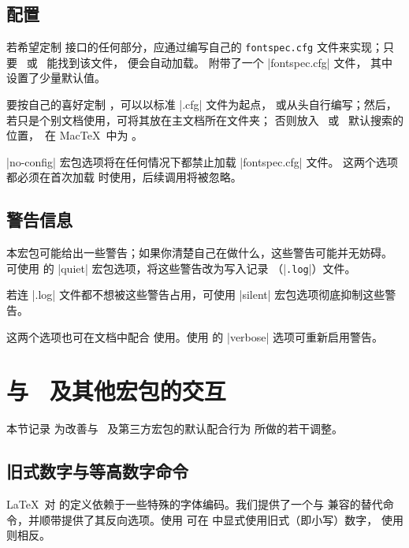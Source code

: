 \documentclass[a4paper]{l3doc}
\begin{document}
\subsection{配置}
\label{sec:config}

若希望定制  接口的任何部分，应通过编写自己的
\texttt{fontspec.cfg} 文件来实现；只要 \XeTeX\ 或 \LuaTeX\ 能找到该文件，
便会自动加载。 附带了一个 |fontspec.cfg| 文件，
其中设置了少量默认值。

要按自己的喜好定制 ，可以以标准 |.cfg| 文件为起点，
或从头自行编写；然后，若只是个别文档使用，可将其放在主文档所在文件夹；
否则放入 \XeTeX\ 或 \LuaTeX\ 默认搜索的位置，\eg\ 在 Mac\TeX\ 中为
。

|no-config| 宏包选项将在任何情况下都禁止加载 |fontspec.cfg| 文件。
这两个选项都必须在首次加载  时使用，后续调用将被忽略。


\subsection{警告信息}
\label{sec:quiet-warnings}

本宏包可能给出一些警告；如果你清楚自己在做什么，这些警告可能并无妨碍。
可使用  的 |quiet| 宏包选项，将这些警告改为写入记录
（|\texttt{.log}|）文件。

若连 |.log| 文件都不想被这些警告占用，可使用 |silent| 宏包选项彻底抑制这些警告。

这两个选项也可在文档中配合  使用。使用 
的 |verbose| 选项可重新启用警告。

\section{与 \LaTeXe\ 及其他宏包的交互}

本节记录  为改善与 \LaTeXe\ 及第三方宏包的默认配合行为
所做的若干调整。



\subsection{旧式数字与等高数字命令}

\DescribeMacro{\oldstylenums}
\DescribeMacro{\liningnums}
\LaTeX\ 对  的定义依赖于一些特殊的字体编码。我们提供了一个与
 兼容的替代命令，并顺带提供了其反向选项。使用
 可在  中显式使用旧式（即小写）数字，
使用  则相反。
\end{document}
